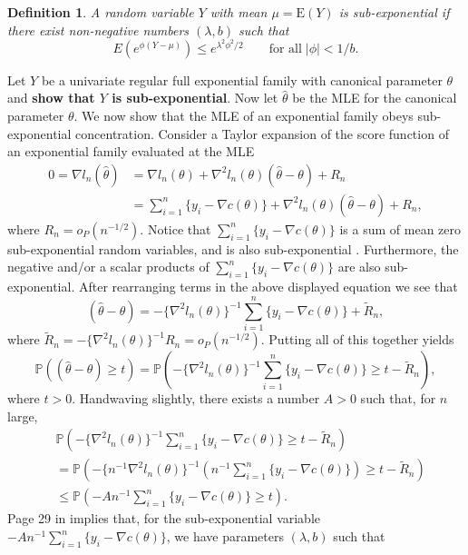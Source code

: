 \documentclass[12pt]{article}
\newcommand{\Prob}{\mathbb{P}}
\newcommand{\E}{\mathrm{E}}
\DeclareMathOperator{\E}{E}
\newtheorem{defn}{Definition}
\begin{document}
\begin{defn}
A random variable $Y$ with mean $\mu = \E(Y)$ is \emph{sub-exponential} if there exist non-negative numbers $(\lambda,b)$ such that 
$$
  E\left(e^{\phi(Y - \mu)}\right) \leq e^{\lambda^2\phi^2/2} 
    \qquad \text{for all} \; |\phi| < 1/b.
$$	
\end{defn}


Let $Y$ be a univariate regular full exponential family with canonical parameter $\theta$ and \textbf{show that $Y$ is sub-exponential}. Now let $\hat\theta$ be the MLE for the canonical parameter $\theta$. We now show that the MLE of an exponential family obeys sub-exponential concentration. Consider a Taylor expansion of the score function of an exponential family evaluated at the MLE
\begin{align*}
  0 = \nabla l_n(\hat\theta) &= \nabla l_n(\theta) 
    + \nabla^2l_n(\theta)(\hat\theta - \theta) + R_n	\\
    &= \sum_{i=1}^n\{y_i - \nabla c(\theta)\} + \nabla^2l_n(\theta)(\hat\theta - \theta) + R_n,
\end{align*}
where $R_n = o_P(n^{-1/2})$. Notice that $\sum_{i=1}^n\{y_i - \nabla c(\theta)\}$ is a sum of mean zero sub-exponential random variables, and is also sub-exponential \citep[Chapter 2]{wainwright2019high}. Furthermore, the negative and/or a scalar products of $\sum_{i=1}^n\{y_i - \nabla c(\theta)\}$ are also sub-exponential. After rearranging terms in the above displayed equation we see that 
$$
  (\hat\theta - \theta) = -\{\nabla^2 l_n(\theta)\}^{-1}\sum_{i=1}^n\{y_i - \nabla c(\theta)\} + \widetilde R_n,
$$
where $\widetilde R_n = -\{\nabla^2l_n(\theta)\}^{-1}R_n = o_P(n^{-1/2})$. Putting all of this together yields
$$
  \Prob\left( (\hat\theta - \theta) \geq t\right) 
  = \Prob\left( -\{\nabla^2l_n(\theta)\}^{-1}\sum_{i=1}^n\{y_i - \nabla c(\theta)\} \geq t - \widetilde R_n\right),
$$
where $t > 0$. Handwaving slightly, there exists a number $A > 0$ such that, for $n$ large, 
\begin{align*}
  &\Prob\left( -\{\nabla^2l_n(\theta)\}^{-1}\sum_{i=1}^n\{y_i - \nabla c(\theta)\} \geq t - \widetilde R_n \right) \\
  &= \Prob\left( -\{n^{-1}\nabla^2l_n(\theta)\}^{-1}\left(n^{-1}\sum_{i=1}^n\{y_i - \nabla c(\theta)\}\right) \geq t - \widetilde R_n\right) \\
  &\leq \Prob\left( -An^{-1}\sum_{i=1}^n\{y_i - \nabla c(\theta)\} \geq t\right).
\end{align*}
Page 29 in \cite{wainwright2019high} implies that, for the sub-exponential variable $-An^{-1}\sum_{i=1}^n\{y_i - \nabla c(\theta)\}$, we have parameters $(\lambda,b)$ such that
\end{document}
